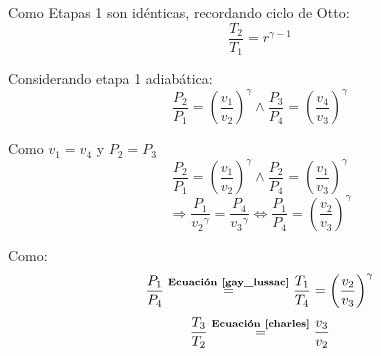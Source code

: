             Como Etapas 1 son idénticas, recordando ciclo de Otto:
            \[\frac{T_{2}}{T_{1}}=r^{\gamma - 1}\]
            
            Considerando etapa 1 adiabática:
            \[\frac{P_{2}}{P_{1}}=\left ( \frac{v_{1}}{v_{2}} \right )^{\gamma} \wedge \frac{P_{3}}{P_{4}}=\left ( \frac{v_{4}}{v_{3}} \right )^{\gamma}\]
            
            Como \(v_{1}=v_{4}\) y \(P_{2}=P_{3}\)
            \[\frac{P_{2}}{P_{1}}=\left ( \frac{v_{1}}{v_{2}} \right )^{\gamma} \wedge \frac{P_{2}}{P_{4}}=\left ( \frac{v_{1}}{v_{3}} \right )^{\gamma}\]
            \[\Rightarrow \frac{P_{1}}{{v_{2}}^{\gamma}}=\frac{P_{4}}{{v_{3}}^{\gamma}} \Leftrightarrow \frac{P_{1}}{P_{4}}=\left ( \frac{v_{2}}{v_{3}} \right )^{\gamma}\]
            
            Como:
            \[\frac{P_{1}}{P_{4}} \overset{\text{\textbf{Ecuación \ref{gay_lussac}}}}{=} \frac{T_{1}}{T_{4}}=\left ( \frac{v_{2}}{v_{3}} \right )^{\gamma}\]
            \[\frac{T_{3}}{T_{2}} \overset{\text{\textbf{Ecuación \ref{charles}}}}{=} {\frac{v_{3}}{v_{2}}}\]
            

